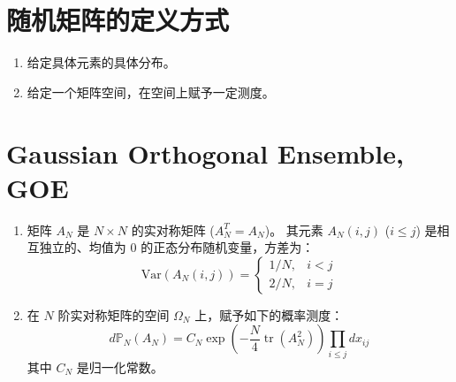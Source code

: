 \theoremstyle{plain}\newtheorem*{1}{习题1}
\theoremstyle{plain}\newtheorem*{2}{习题2}
\theoremstyle{plain}\newtheorem*{3}{习题3}
\theoremstyle{plain}\newtheorem*{4}{习题4}
\theoremstyle{plain}\newtheorem*{5}{习题5}
\theoremstyle{plain}\newtheorem*{6}{习题6}
\theoremstyle{plain}\newtheorem*{7}{习题7}
\theoremstyle{plain}\newtheorem*{8}{习题8}
\theoremstyle{plain}\newtheorem*{9}{习题9}
\theoremstyle{plain}\newtheorem*{10}{习题10}
\def\E{\mathbb{E}}
\def\B{\mathcal{B}}
\def\M{\mathcal{M}}
\def\prob{\mathbb{P}}
\def\t{\underline{t}}
\def\c{\underline{c}}
\newtheorem{prop}{性质}

\section{随机矩阵的定义方式}
\begin{enumerate}
    \item 给定具体元素的具体分布。
    \item 给定一个矩阵空间，在空间上赋予一定测度。
\end{enumerate}

\section{Gaussian Orthogonal Ensemble, GOE}
\begin{definition}
\begin{enumerate}
    \item[(一)] 矩阵 $A_N$ 是 $N \times N$ 的实对称矩阵 ($A_N^T=A_N$)。
    其元素 $A_N(i,j)$ ($i \le j$) 是相互独立的、均值为 $0$ 的正态分布随机变量，方差为：
    \[ \text{Var}(A_N(i,j)) = \begin{cases} 1/N, & i < j \\ 2/N, & i = j \end{cases} \]
    \item[(二)] 在 $N$ 阶实对称矩阵的空间 $\Omega_N$ 上，赋予如下的概率测度：
    \[ d\mathbb{P}_N(A_N) = C_N \exp\left(-\frac{N}{4} \operatorname{tr}(A_N^2)\right) \prod_{ i \le j } dx_{ij} \]
    其中 $C_N$ 是归一化常数。
\end{enumerate}
\end{definition}

